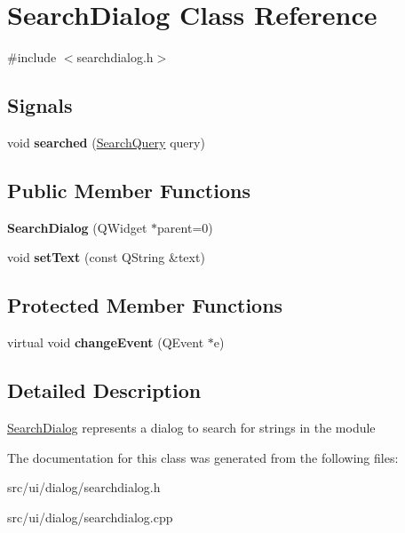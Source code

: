 \hypertarget{classSearchDialog}{
\section{SearchDialog Class Reference}
\label{classSearchDialog}
}


{\ttfamily \#include $<$searchdialog.h$>$}

\subsection*{Signals}
\begin{DoxyCompactItemize}
\item 
\hypertarget{classSearchDialog_a905b1777406bcdee448b1a8e2e3950e7}{
void {\bfseries searched} (\hyperlink{classSearchQuery}{SearchQuery} query)}
\label{classSearchDialog_a905b1777406bcdee448b1a8e2e3950e7}

\end{DoxyCompactItemize}
\subsection*{Public Member Functions}
\begin{DoxyCompactItemize}
\item 
\hypertarget{classSearchDialog_a65ff3c491f44bdba0894e9661ad4335d}{
{\bfseries SearchDialog} (QWidget $\ast$parent=0)}
\label{classSearchDialog_a65ff3c491f44bdba0894e9661ad4335d}

\item 
\hypertarget{classSearchDialog_a41694fcd52d8f21f0e7259cab44a60b0}{
void {\bfseries setText} (const QString \&text)}
\label{classSearchDialog_a41694fcd52d8f21f0e7259cab44a60b0}

\end{DoxyCompactItemize}
\subsection*{Protected Member Functions}
\begin{DoxyCompactItemize}
\item 
\hypertarget{classSearchDialog_a58fdc61fba05c488cb163788cd40a405}{
virtual void {\bfseries changeEvent} (QEvent $\ast$e)}
\label{classSearchDialog_a58fdc61fba05c488cb163788cd40a405}

\end{DoxyCompactItemize}


\subsection{Detailed Description}
\hyperlink{classSearchDialog}{SearchDialog} represents a dialog to search for strings in the module 

The documentation for this class was generated from the following files:\begin{DoxyCompactItemize}
\item 
src/ui/dialog/searchdialog.h\item 
src/ui/dialog/searchdialog.cpp\end{DoxyCompactItemize}
